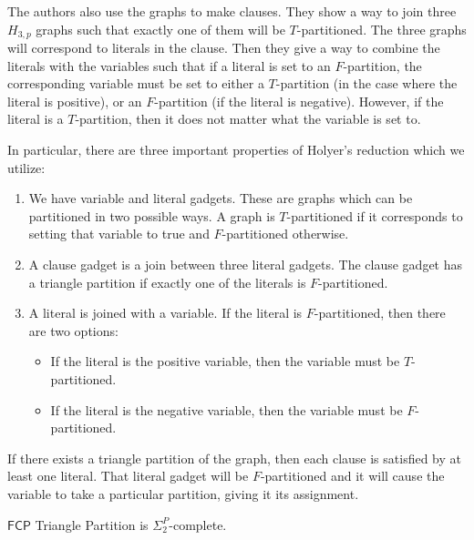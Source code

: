\documentclass[runningheads,a4paper]{llncs}
\begin{document}
The authors also use the graphs to make clauses. They show a way to join three $H_{3,p}$ graphs such that exactly one of them will be $T$-partitioned. The three graphs will correspond to literals in the clause. Then they give a way to combine the literals with the variables such that if a literal is set to an $F$-partition, the corresponding variable must be set to either a $T$-partition (in the case where the literal is positive), or an $F$-partition (if the literal is negative). However, if the literal is a $T$-partition, then it does not matter what the variable is set to. 

In particular, there are three important properties of Holyer's reduction which we utilize:
\begin{enumerate}
\item We have variable and literal gadgets. These are graphs which can be partitioned in two possible ways. A graph is $T$-partitioned if it corresponds to setting that variable to true and $F$-partitioned otherwise.  
\item A clause gadget is a join between three literal gadgets. The clause gadget has a triangle partition if exactly one of the literals is $F$-partitioned.
\item A literal is joined with a variable. If the literal is $F$-partitioned, then there are two options:
\begin{itemize}
\item If the literal is the positive variable, then the variable must be $T$-partitioned.
\item If the literal is the negative variable, then the variable must be $F$-partitioned.
\end{itemize}
\end{enumerate}

If there exists a triangle partition of the graph, then each clause is satisfied by at least one literal. That literal gadget will be $F$-partitioned and it will cause the variable to take a particular partition, giving it its assignment. 

\begin{theorem}
$\mathsf{FCP}$ Triangle Partition is $\Sigma_2^P$-complete.
\end{theorem}
\end{document}
